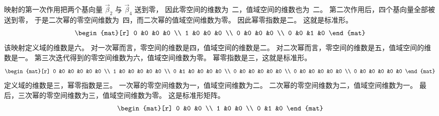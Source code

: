 \begin{exercises}
\begin{answer}
\begin{exparts}
           映射的第一次作用把两个基向量 $\vec{\beta}_2$ 与
           $\vec{\beta}_4$ 送到零，
           因此零空间的维数为~二，值域空间的维数也为~二。
           第二次作用后，四个基向量全部被送到零，
           于是二次幂的零空间维数为~四，而二次幂的值域空间维数为零。
           因此幂零指数是二。
           这就是标准形。
           \begin{equation*}
             \begin{mat}[r]
               0  &0  &0  &0  \\
               1  &0  &0  &0  \\
               0  &0  &0  &0  \\
               0  &0  &1  &0
             \end{mat}
           \end{equation*}
         \partsitem 该映射定义域的维数是六。
           对一次幂而言，零空间的维数是四，值域空间的维数是二。
           对二次幂而言，零空间的维数是五，值域空间的维数是一。
           第三次迭代得到的零空间维数为六，值域空间维数为零。
           幂零指数是三，这就是标准形。
           \begin{equation*}
             \begin{mat}[r]
               0  &0  &0  &0  &0  &0  \\
               1  &0  &0  &0  &0  &0  \\
               0  &1  &0  &0  &0  &0  \\
               0  &0  &0  &0  &0  &0  \\
               0  &0  &0  &0  &0  &0  \\
               0  &0  &0  &0  &0  &0
             \end{mat}
           \end{equation*}
         \partsitem 定义域的维数是三，幂零指数是三。
           一次幂的零空间维数为一，值域空间维数为二。
           二次幂的零空间维数为二，值域空间维数为一。
           最后，三次幂的零空间维数为三，值域空间维数为零。
           这是标准形矩阵。
           \begin{equation*}
             \begin{mat}[r]
               0  &0  &0  \\
               1  &0  &0  \\
               0  &1  &0
             \end{mat}
          \end{equation*}
      \end{exparts}
    \end{answer}

\end{exercises}
